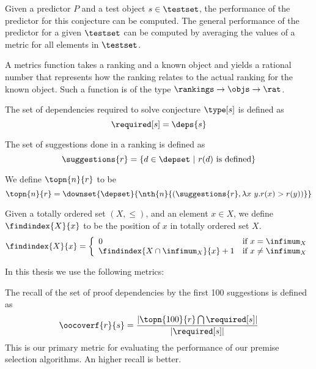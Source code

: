 Given a predictor $P$ and a test object $s \in \testset$,
the performance of the predictor for this conjecture can be computed.
The general performance of the predictor for a given $\testset$
can be computed by averaging the values of a metric for all elements in $\testset$.

\begin{definition}
  A metrics function takes a ranking and a known object and yields a rational number
  that represents how the ranking relates to the actual ranking for the known object.
  Such a function is of the type $\rankings \rightarrow \objs \rightarrow \rat$.
\end{definition}

\begin{definition} The set of dependencies required to solve conjecture $\type[s]$ is defined as
  \[ \required[s] = \deps{s} \]
\end{definition}

\begin{definition} The set of suggestions done in a ranking is defined as
  \[ \suggestions{r} = \{ d \in \depset ~|~ r(d) ~\text{is defined} \} \]
\end{definition}

\begin{definition} We define $\topn{n}{r}$ to be
  \[ \topn{n}{r} = \downset{\depset}{\nth{n}{(\suggestions{r}, \lambda x~y. r(x) > r(y))}} \]
\end{definition}

\begin{definition}
  Given a totally ordered set $(X, \leq)$, and an element $x \in X$, we define $\findindex{X}{x}$ to be the position of $x$ in totally ordered set $X$.
  \[ \findindex{X}{x} = \left\{
    \begin{array}{ll}
      0 & \text{if~} x = \infimum_X \\
      \findindex{X \cap \infimum_X}{x}+1 & \text{if~} x \neq \infimum_X \\
    \end{array}
    \right.
  \]
\end{definition}

In this thesis we use the following metrics:
\begin{definition}[\oocover]
  The recall of the set of proof dependencies by the first 100 suggestions is defined as
  \[ \oocoverf{r}{s} = \frac{ |\topn{100}{r} \bigcap \required[s]| } { |\required[s]| } \]
  This is our primary metric for evaluating the performance of our premise selection algorithms.
  An higher recall is better.
\end{definition}

